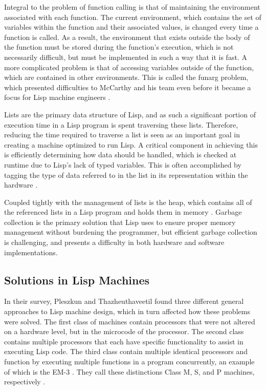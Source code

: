 \documentclass[journal]{IEEEtran}
\begin{document}
Integral to the problem of function calling is that of maintaining the environment associated with each function. The current environment, which contains the set of variables within the function and their associated values, is changed every time a function is called. As a result, the environment that exists outside the body of the function must be stored during the function's execution, which is not necessarily difficult, but must be implemented in such a way that it is fast. A more complicated problem is that of accessing variables outside of the function, which are contained in other environments. This is called the funarg problem, which presented difficulties to McCarthy and his team even before it became a focus for Lisp machine engineers \cite{stoyan, pt}.

Lists are the primary data structure of Lisp, and as such a significant portion of execution time in a Lisp program is spent traversing these lists. Therefore, reducing the time required to traverse a list is seen as an important goal in creating a machine optimized to run Lisp. A critical component in achieving this is efficiently determining how data should be handled, which is checked at runtime due to Lisp's lack of typed variables. This is often accomplished by tagging the type of data referred to in the list in its representation within the hardware \cite{pt}.

Coupled tightly with the management of lists is the heap, which contains all of the referenced lists in a Lisp program and holds them in memory \cite{pt}. Garbage collection is the primary solution that Lisp uses to ensure proper memory management without burdening the programmer, but efficient garbage collection is challenging, and presents a difficulty in both hardware and software implementations.

\subsection{Solutions in Lisp Machines}
In their survey, Pleszkun and Thazheuthaveetil found three different general approaches to Lisp machine design, which in turn affected how these problems were solved. The first class of machines contain processors that were not altered on a hardware level, but in the microcode of the processor. The second class contains multiple processors that each have specific functionality to assist in executing Lisp code. The third class contain multiple identical processors and function by executing multiple functions in a program concurrently, an example of which is the EM-3 \cite{yamaguchi}. They call these distinctions Class M, S, and P machines, respectively \cite{pt}.
\end{document}
